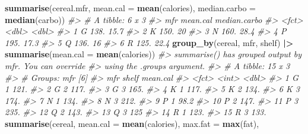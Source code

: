 \documentclass[
]{book}
\newenvironment{Shaded}{\begin{snugshade}}{\end{snugshade}}
\newcommand{\AttributeTok}[1]{\textcolor[rgb]{0.13,0.29,0.53}{#1}}
\newcommand{\CommentTok}[1]{\textcolor[rgb]{0.56,0.35,0.01}{\textit{#1}}}
\newcommand{\FunctionTok}[1]{\textcolor[rgb]{0.13,0.29,0.53}{\textbf{#1}}}
\newcommand{\NormalTok}[1]{#1}
\newcommand{\SpecialCharTok}[1]{\textcolor[rgb]{0.81,0.36,0.00}{\textbf{#1}}}
\begin{document}
\begin{Shaded}
\begin{Highlighting}[]
\FunctionTok{summarise}\NormalTok{(cereal.mfr, }\AttributeTok{mean.cal =} \FunctionTok{mean}\NormalTok{(calories), }
          \AttributeTok{median.carbo =} \FunctionTok{median}\NormalTok{(carbo))}
\CommentTok{\#\textgreater{} \# A tibble: 6 x 3}
\CommentTok{\#\textgreater{}   mfr   mean.cal median.carbo}
\CommentTok{\#\textgreater{}   \textless{}fct\textgreater{}    \textless{}dbl\textgreater{}        \textless{}dbl\textgreater{}}
\CommentTok{\#\textgreater{} 1 G         138.         15.7}
\CommentTok{\#\textgreater{} 2 K         150.         20  }
\CommentTok{\#\textgreater{} 3 N         160.         28.4}
\CommentTok{\#\textgreater{} 4 P         195.         17.3}
\CommentTok{\#\textgreater{} 5 Q         136.         16  }
\CommentTok{\#\textgreater{} 6 R         125.         22.4}
\FunctionTok{group\_by}\NormalTok{(cereal, mfr, shelf) }\SpecialCharTok{|\textgreater{}} 
    \FunctionTok{summarise}\NormalTok{(}\AttributeTok{mean.cal =} \FunctionTok{mean}\NormalTok{(calories))}
\CommentTok{\#\textgreater{} \textasciigrave{}summarise()\textasciigrave{} has grouped output by \textquotesingle{}mfr\textquotesingle{}. You can override}
\CommentTok{\#\textgreater{} using the \textasciigrave{}.groups\textasciigrave{} argument.}
\CommentTok{\#\textgreater{} \# A tibble: 15 x 3}
\CommentTok{\#\textgreater{} \# Groups:   mfr [6]}
\CommentTok{\#\textgreater{}    mfr   shelf mean.cal}
\CommentTok{\#\textgreater{}    \textless{}fct\textgreater{} \textless{}int\textgreater{}    \textless{}dbl\textgreater{}}
\CommentTok{\#\textgreater{}  1 G         1    121. }
\CommentTok{\#\textgreater{}  2 G         2    117. }
\CommentTok{\#\textgreater{}  3 G         3    165. }
\CommentTok{\#\textgreater{}  4 K         1    117. }
\CommentTok{\#\textgreater{}  5 K         2    134. }
\CommentTok{\#\textgreater{}  6 K         3    174. }
\CommentTok{\#\textgreater{}  7 N         1    134. }
\CommentTok{\#\textgreater{}  8 N         3    212. }
\CommentTok{\#\textgreater{}  9 P         1     98.2}
\CommentTok{\#\textgreater{} 10 P         2    147. }
\CommentTok{\#\textgreater{} 11 P         3    235. }
\CommentTok{\#\textgreater{} 12 Q         2    143. }
\CommentTok{\#\textgreater{} 13 Q         3    125  }
\CommentTok{\#\textgreater{} 14 R         1    123. }
\CommentTok{\#\textgreater{} 15 R         3    133.}
\FunctionTok{summarise}\NormalTok{(cereal, }\AttributeTok{mean.cal =} \FunctionTok{mean}\NormalTok{(calories), }\AttributeTok{max.fat =} \FunctionTok{max}\NormalTok{(fat), }

\end{Highlighting}
\end{Shaded}
\end{document}
